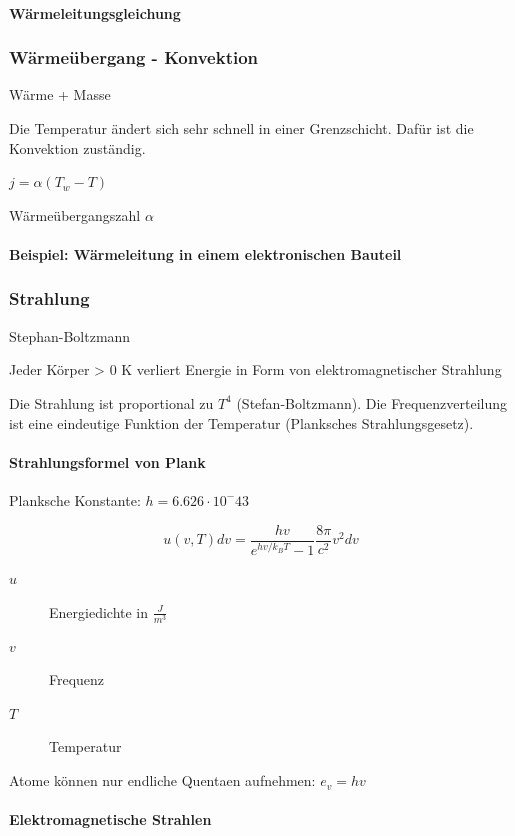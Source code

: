 \documentclass[a4paper]{scrartcl}
\begin{document}
\paragraph{Wärmeleitungsgleichung} %

\subsubsection{Wärmeübergang - Konvektion}
Wärme + Masse

Die Temperatur ändert sich sehr schnell in einer Grenzschicht. Dafür ist die Konvektion zuständig.

$j = \alpha (T_w - T)$

Wärmeübergangszahl $\alpha$

\paragraph{Beispiel: Wärmeleitung in einem elektronischen Bauteil}




\subsubsection{Strahlung}
Stephan-Boltzmann


Jeder Körper > 0 K verliert Energie in Form von elektromagnetischer Strahlung

Die Strahlung ist proportional zu $T^4$ (Stefan-Boltzmann). Die Frequenzverteilung ist eine eindeutige Funktion der Temperatur (Planksches Strahlungsgesetz).

\paragraph{Strahlungsformel von Plank}

Planksche Konstante: $h = 6.626 \cdot 10^-43$

\[
	u(v,T)dv = \frac{hv}{e^{hv/k_BT} - 1} \frac{8\pi}{c^2} v^2 dv
\]

\begin{description}
	\item[$u$] Energiedichte in $\frac{J}{m^3}$
	\item[$v$] Frequenz
	\item[$T$] Temperatur
\end{description}

Atome können nur endliche Quentaen aufnehmen: $e_v = hv$


\paragraph{Elektromagnetische Strahlen}
\end{document}
